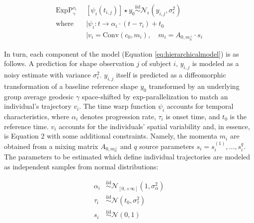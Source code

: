 					\begin{align}
						\text{ExpP}_{\gamma}^{v_{i}} &[\psi_{i}(t_{i,j})] \star y_{0} \mathop{\sim}\limits^{\text{iid}} \mathcal{N}_{\epsilon}(y_{i,j}, \sigma_{\epsilon}^{2})\label{eq:hierarchicalmodel} \\
						\text{where} \quad & \vert\psi_{i} : t \rightarrow \alpha_{i} \cdot (t- \tau_{i}) + t_{0} \nonumber \\ 
						& \vert v_{i} = \mathrm{Conv}(c_{0}, m_{i}), \quad m_{i} = A_{0, m_{0}^{\perp}} \cdot s_{i} \nonumber
                     \end{align}
				
				In turn, each component of the model (Equation \ref{eq:hierarchicalmodel}) is as follows. A prediction for shape observation $j$ of subject $i$, $y_{i,j}$ is modeled as a noisy estimate with variance $\sigma_{\epsilon}^2$. $y_{i,j}$ itself is predicted as a diffeomorphic transformation of a baseline reference shape $y_{0}$ transformed by an underlying group average geodesic $\gamma$ space-shifted by exp-parallelization to match an individual's trajectory $v_{i}$. The time warp function $\psi_{i}$ accounts for temporal characteristics, where $\alpha_{i}$ denotes progression rate, $\tau_{i}$ is onset time, and $t_{0}$ is the reference time. $v_{i}$ accounts for the individuals' spatial variability and, in essence, is Equation 2 with some additional constraints. Namely, the momenta $m_{i}$ are obtained from a mixing matrix $A_{0, m_{0}^{\perp}}$ and $q$ source parameters $s_{i} = s_{i}^{(1)}, ..., s_{i}^{q}$. The parameters to be estimated which define individual trajectories are modeled as independent samples from normal distributions: 
				
					\begin{align}
						\alpha_{i} &\mathop{\sim}\limits^{\text{iid}} \mathcal{N}_{[0, +\infty]} (1, \sigma_{\alpha}^2) \\
						\tau_{i} &\mathop{\sim}\limits^{\text{iid}} \mathcal{N}(t_{0}, \sigma_{\tau}^2) \nonumber \\
						s_{i} &\mathop{\sim}\limits^{\text{iid}} \mathcal{N}(0, 1) \nonumber	
						\end{align}

